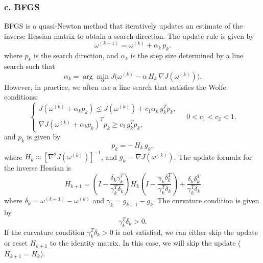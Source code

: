\documentclass{article}
\begin{document}
\subsubsection{c. BFGS}
BFGS is a quasi-Newton method that iteratively updates an estimate of the inverse Hessian matrix to obtain a search direction. The update rule is given by
\[
\omega^{(k+1)}=\omega^{(k)}+\alpha_k\,p_k.
\]
where \(p_k\) is the search direction, and \(\alpha_k\) is the step size determined by a line search such that
\[
\alpha_k = \arg\min_{\alpha} J\!\bigl(\omega^{(k)} - \alpha\, H_k\, \nabla J(\omega^{(k)})\bigr).
\]
However, in practice, we often use a line search that satisfies the Wolfe conditions:
\[
\begin{cases}
J(\omega^{(k)}+\alpha_k p_k)\le J(\omega^{(k)})+c_1\alpha_k\,g_k^Tp_k,\\
\nabla J(\omega^{(k)}+\alpha_k p_k)^Tp_k\ge c_2\,g_k^Tp_k,
\end{cases}
\quad 0<c_1<c_2<1.
\]
and \(p_k\) is given by
\[
p_k = -\,H_k\,g_k,
\]
where \(H_k\approx[\nabla^2J(\omega^{(k)})]^{-1}\), and \(g_k = \nabla J(\omega^{(k)})\). The update formula for the inverse Hessian is
\[ H_{k+1} = \left(I - \frac{\delta_k \gamma_k^T}{\gamma_k^T \delta_k}\right) H_k \left(I - \frac{\gamma_k \delta_k^T}{\gamma_k^T \delta_k}\right) + \frac{\delta_k \delta_k^T}{\gamma_k^T \delta_k} \]
where \(\delta_k = \omega^{(k+1)} - \omega^{(k)}\) and \(\gamma_k = g_{k+1} - g_k\). The curvature condition is given by
\[
\gamma_k^T \delta_k > 0.
\]
If the curvature condition \(\gamma_k^T \delta_k > 0\) is not satisfied, we can either skip the update or reset \(H_{k+1}\) to the identity matrix. In this case, we will skip the update (\(H_{k+1}=H_k\)).
\end{document}
